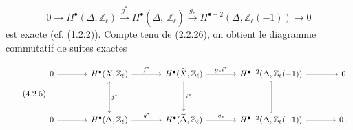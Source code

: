 \begin{equation}\tag{4.2.4}
0 \longrightarrow H^{\bullet}(\Delta,\mathbb{Z}_{\ell}) \stackrel{g^{*}}{\longrightarrow} H^{\bullet}(\widetilde{\Delta},\ \mathbb{Z}_{\ell}) \stackrel{g_{*}}{\longrightarrow} H^{\bullet-2}(\Delta,\mathbb{Z}_{\ell}(-1)) \longrightarrow 0
\end{equation}
est exacte (cf. (1.2.2)). Compte tenu de (2.2.26), on obtient le diagramme commutatif  de suites exactes

\begin{equation}\tag{4.2.5}
\begin{tikzcd}[column sep=large, row sep=huge]
0 \arrow[r] & H^{\bullet}(X,\mathbb{Z}_{\ell}) \arrow[r, "f^{*}"] \arrow[d, leftrightarrow, "j^{*}"] & H^{\bullet}(\widetilde{X},\mathbb{Z}_{\ell}) \arrow[r, "g_{*}i^{*}"] \arrow[d, "i^{*}"] & H^{\bullet-2}(\Delta,\mathbb{Z}_{\ell}(-1)) \arrow[r] \arrow[d, Rightarrow, no head] & 0 \\
0 \arrow[r] & H^{\bullet}(\Delta,\mathbb{Z}_{\ell}) \arrow[r, "g^{*}"] & H^{\bullet}(\widetilde{\Delta},\mathbb{Z}_{\ell}) \arrow[r, "g_{*}"] & H^{\bullet-2}(\Delta,\mathbb{Z}_{\ell}(-1)) \arrow[r] & 0\;.
\end{tikzcd}
\end{equation}

